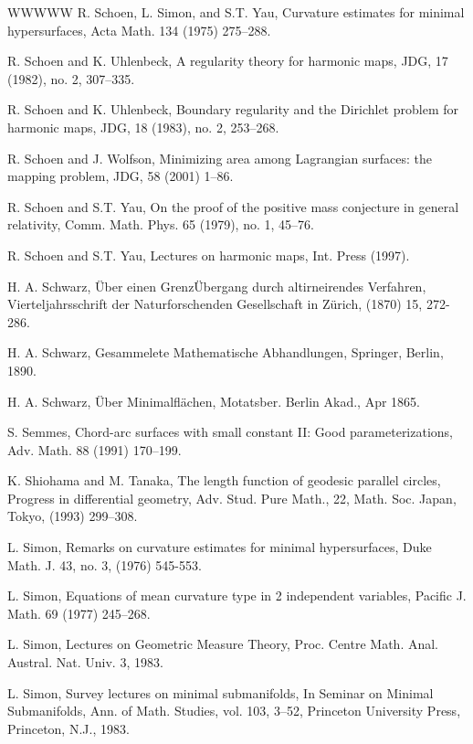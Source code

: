 \begin{thebibliography}{WWWWW}
 R. Schoen, L. Simon, and S.T. Yau, Curvature estimates for minimal hypersurfaces, Acta Math. 134 (1975) 275–288.

 R. Schoen and K. Uhlenbeck, A regularity theory for harmonic maps, JDG, 17 (1982), no. 2, 307–335.

 R. Schoen and K. Uhlenbeck, Boundary regularity and the Dirichlet problem for harmonic maps, JDG, 18 (1983), no. 2, 253–268.

 R. Schoen and J. Wolfson, Minimizing area among Lagrangian surfaces: the mapping problem, JDG, 58 (2001) 1–86.

 R. Schoen and S.T. Yau, On the proof of the positive mass conjecture in general relativity, Comm. Math. Phys. 65 (1979), no. 1, 45–76.

 R. Schoen and S.T. Yau, Lectures on harmonic maps, Int. Press (1997).

 H. A. Schwarz, Über einen GrenzÜbergang durch altirneirendes Verfahren, Vierteljahrsschrift der Naturforschenden Gesellschaft in Zürich, (1870) 15, 272-286.

 H. A. Schwarz, Gesammelete Mathematische Abhandlungen, Springer, Berlin, 1890.

 H. A. Schwarz, Über Minimalflächen, Motatsber. Berlin Akad., Apr 1865.

 S. Semmes, Chord-arc surfaces with small constant II: Good parameterizations, Adv. Math. 88 (1991) 170–199.

 K. Shiohama and M. Tanaka, The length function of geodesic parallel circles, Progress in differential geometry, Adv. Stud. Pure Math., 22, Math. Soc. Japan, Tokyo, (1993) 299–308.

 L. Simon, Remarks on curvature estimates for minimal hypersurfaces, Duke Math. J. 43, no. 3, (1976) 545-553.

 L. Simon, Equations of mean curvature type in 2 independent variables, Pacific J. Math. 69 (1977) 245–268.

 L. Simon, Lectures on Geometric Measure Theory, Proc. Centre Math. Anal. Austral. Nat. Univ. 3, 1983.

 L. Simon, Survey lectures on minimal submanifolds, In Seminar on Minimal Submanifolds, Ann. of Math. Studies, vol. 103, 3–52, Princeton University Press, Princeton, N.J., 1983.


\end{thebibliography}
